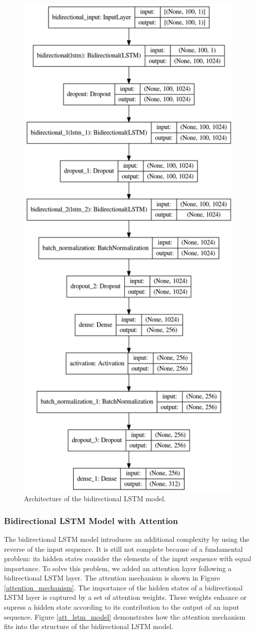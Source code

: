 \documentclass[sigconf,authorversion]{acmart}
\begin{document}
\begin{figure}[h]
  \centering
  \includegraphics[width=0.6\linewidth]{bidirect_lstm_model.png}
  \caption{Architecture of the bidirectional LSTM model.}
  \label{bidirect_lstm_model}
\end{figure}

\subsubsection{Bidirectional LSTM Model with Attention}

The bidirectional LSTM model introduces an additional complexity by using the 
reverse of the input sequence. It is still not complete because of a fundamental
problem: its hidden states consider the elements of the input sequence with 
equal importance. To solve this problem, we added an attention layer following 
a bidirectional LSTM layer. The attention mechanism is shown in Figure 
\ref{attention_mechanism}. The importance of the hidden states of a bidirectional 
LSTM layer is captured by a set of attention weights. These weights enhance or 
supress a hidden state according to its contribution to the output of an input
sequence. Figure \ref{att_lstm_model} demonstrates how the attention mechanism
fits into the structure of the bidirectional LSTM model.
\end{document}
